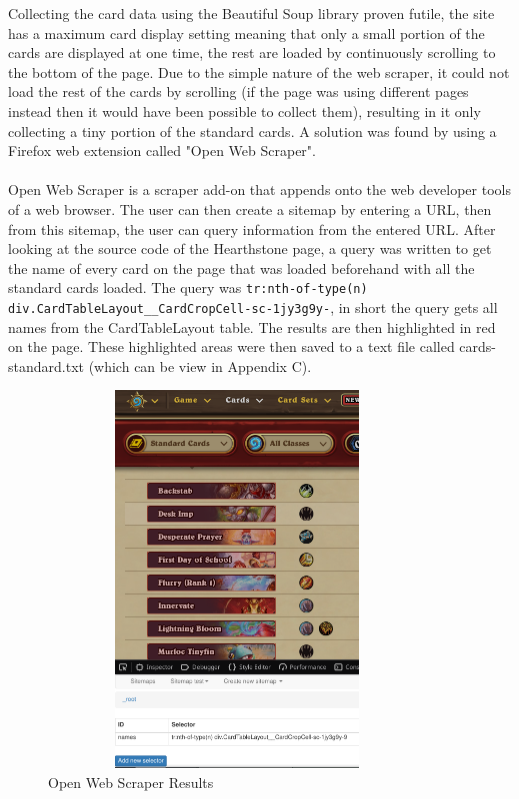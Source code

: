 \documentclass{report} %
\begin{document}
\indent Collecting the card data using the Beautiful Soup library proven futile, the site has a maximum card display setting meaning that only a small portion of the cards are displayed at one time, the rest are loaded by continuously scrolling to the bottom of the page. Due to the simple nature of the web scraper, it could not load the rest of the cards by scrolling (if the page was using different pages instead then it would have been possible to collect them), resulting in it only collecting a tiny portion of the standard cards. A solution was found by using a Firefox web extension called "Open Web Scraper"\footnotemark. \\ \\
Open Web Scraper is a scraper add-on that appends onto the web developer tools of a web browser. The user can then create a sitemap by entering a URL, then from this sitemap, the user can query information from the entered URL. After looking at the source code of the Hearthstone page, a query was written to get the name of every card on the page that was loaded beforehand with all the standard cards loaded. The query was \nolinkurl{tr:nth-of-type(n) div.CardTableLayout__CardCropCell-sc-1jy3g9y-}, in short the query gets all names from the CardTableLayout table. The results are then highlighted in red on the page. These highlighted areas were then saved to a text file called cards-standard.txt (which can be view in Appendix C).

\begin{figure}[H]
\centering
\includegraphics[width=10cm,height=10cm,keepaspectratio]{OpenWebScraper}
\caption{Open Web Scraper Results\protect}
\label{board}
\end{figure}
\end{document}
